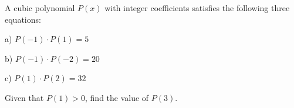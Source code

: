 A cubic polynomial $P(x)$ with integer coefficients satisfies the following three equations:

a) $P(-1)\cdot P(1)=5$

b) $P(-1)\cdot P(-2)=20$

c) $P(1)\cdot P(2)=32$

Given that $P(1)>0$, find the value of $P(3)$.

